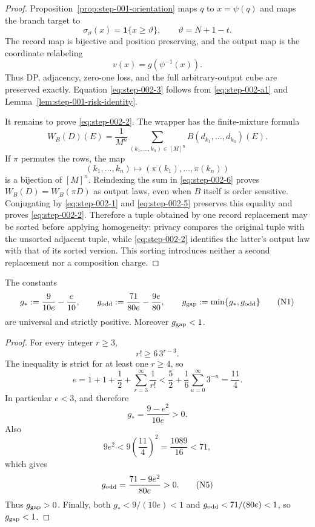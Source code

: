 \begin{proof}

Proposition~\ref{prop:step-001-orientation} maps \(q\) to \(x=\psi(q)\) and maps the branch target to
\[
\sigma_\vartheta(x)=\mathbf 1\{x\ge\vartheta\},
\qquad
\vartheta=N+1-t.
\tag{4}\label{eq:step-002-4}
\]
The record map is bijective and position preserving, and the output map is the coordinate relabeling
\[
v(x)=g(\psi^{-1}(x)).
\tag{5}\label{eq:step-002-5}
\]
Thus DP, adjacency, zero-one loss, and the full arbitrary-output cube are preserved exactly. Equation \eqref{eq:step-002-3} follows from \eqref{eq:step-002-a1} and Lemma~\ref{lem:step-001-risk-identity}.

It remains to prove \eqref{eq:step-002-2}. The wrapper has the finite-mixture formula
\[
W_B(D)(E)
=\frac1{M^n}\sum_{(k_1,\ldots,k_n)\in[M]^n}
B(d_{k_1},\ldots,d_{k_n})(E).
\tag{6}\label{eq:step-002-6}
\]
If \(\pi\) permutes the rows, the map
\[
(k_1,\ldots,k_n)\longmapsto
(\pi(k_1),\ldots,\pi(k_n))
\]
is a bijection of \([M]^n\). Reindexing the sum in \eqref{eq:step-002-6} proves
\(W_B(D)=W_B(\pi D)\) as output laws, even when \(B\) itself is order sensitive. Conjugating by \eqref{eq:step-002-1} and \eqref{eq:step-002-5} preserves this equality and proves \eqref{eq:step-002-2}. Therefore a tuple obtained by one record replacement may be sorted before applying homogeneity: privacy compares the original tuple with the unsorted adjacent tuple, while \eqref{eq:step-002-2} identifies the latter's output law with that of its sorted version. This sorting introduces neither a second replacement nor a composition charge.

\end{proof}


\begin{lemma}
\label{lem:step-002-numerical-gap}

The constants
\[
g_*:=\frac9{10e}-\frac e{10},
\qquad
g_{\rm odd}:=\frac{71}{80e}-\frac{9e}{80},
\qquad
g_{\rm gap}:=\min\{g_*,g_{\rm odd}\}
\tag{N1}\label{eq:step-002-n1}
\]
are universal and strictly positive. Moreover \(g_{\rm gap}<1\).

\end{lemma}

\begin{proof}

For every integer \(r\ge 3\),
\[
r!\ge6\,3^{r-3}.
\]
The inequality is strict for at least one \(r\ge 4\), so
\[
e=1+1+\frac12+\sum_{r=3}^\infty\frac1{r!}
<\frac52+\frac16\sum_{u=0}^\infty3^{-u}
=\frac{11}{4}.
\tag{N2}\label{eq:step-002-n2}
\]
In particular \(e<3\), and therefore
\[
g_*=\frac{9-e^2}{10e}>0.
\tag{N3}\label{eq:step-002-n3}
\]
Also
\[
9e^2<9\left(\frac{11}{4}\right)^2
=\frac{1089}{16}<71,
\tag{N4}\label{eq:step-002-n4}
\]
which gives
\[
g_{\rm odd}=\frac{71-9e^2}{80e}>0.
\tag{N5}\label{eq:step-002-n5}
\]
Thus \(g_{\rm gap}>0\). Finally, both \(g_*<9/(10e)<1\) and
\(g_{\rm odd}<71/(80e)<1\), so \(g_{\rm gap}<1\).

\end{proof}


